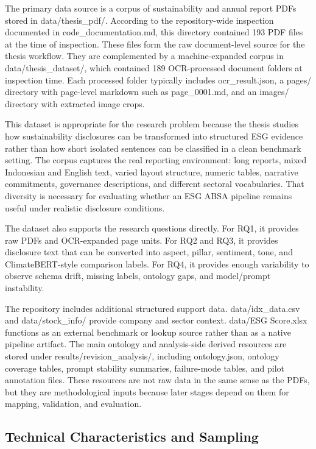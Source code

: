 \documentclass[english, online, cse, master]{dithesis}
\begin{document}
The primary data source is a corpus of sustainability and annual report PDFs stored in data/thesis\_pdf/. According to the repository-wide inspection documented in code\_documentation.md, this directory contained 193 PDF files at the time of inspection. These files form the raw document-level source for the thesis workflow. They are complemented by a machine-expanded corpus in data/thesis\_dataset/, which contained 189 OCR-processed document folders at inspection time. Each processed folder typically includes ocr\_result.json, a pages/ directory with page-level markdown such as page\_0001.md, and an images/ directory with extracted image crops.

This dataset is appropriate for the research problem because the thesis studies how sustainability disclosures can be transformed into structured ESG evidence rather than how short isolated sentences can be classified in a clean benchmark setting. The corpus captures the real reporting environment: long reports, mixed Indonesian and English text, varied layout structure, numeric tables, narrative commitments, governance descriptions, and different sectoral vocabularies. That diversity is necessary for evaluating whether an ESG ABSA pipeline remains useful under realistic disclosure conditions.

The dataset also supports the research questions directly. For RQ1, it provides raw PDFs and OCR-expanded page units. For RQ2 and RQ3, it provides disclosure text that can be converted into aspect, pillar, sentiment, tone, and ClimateBERT-style comparison labels. For RQ4, it provides enough variability to observe schema drift, missing labels, ontology gaps, and model/prompt instability.

The repository includes additional structured support data. data/idx\_data.csv and data/stock\_info/ provide company and sector context. data/ESG Score.xlsx functions as an external benchmark or lookup source rather than as a native pipeline artifact. The main ontology and analysis-side derived resources are stored under results/revision\_analysis/, including ontology.json, ontology coverage tables, prompt stability summaries, failure-mode tables, and pilot annotation files. These resources are not raw data in the same sense as the PDFs, but they are methodological inputs because later stages depend on them for mapping, validation, and evaluation.

\subsection{Technical Characteristics and Sampling}
\end{document}
